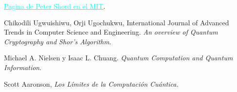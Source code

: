 \documentclass[a4paper,11pt]{article}
\begin{document}
\newpage
\begin{thebibliography}{3}
     \href{https://math.mit.edu/~shor/}{\textcolor{cyan}{\underline{Pagina de Peter Shord en el MIT}}}.

     Chikodili Ugwuishiwu, Orji Ugochukwu, International Journal of Advanced Trends in Computer Science and Engineering. \emph{An overview of Quantum Cryptography and Shor's Algorithm}.

     Michael A. Nielsen y Isaac L. Chuang. \emph{Quantum Computation and Quantum Information}.

     Scott Aaronson, \emph{Los L\'imites de la Computaci\'on Cu\'antica}.
\end{thebibliography}
\end{document}
